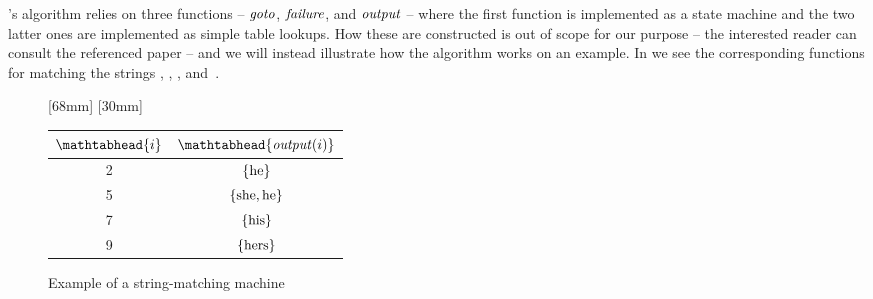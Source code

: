 \citeauthor{AhoCorasick:1975}'s algorithm relies on three functions --
$\textrm{\textit{goto}}$, $\textrm{\textit{failure}}$, and $\textrm{\textit{output}}$ -- where the
first function is implemented as a \gls{state machine} and the two latter ones
are implemented as simple table lookups.
%
How these are constructed is out of scope for our purpose -- the interested
reader can consult the referenced paper -- and we will instead illustrate how
the algorithm works on an example.
%
In  we see the corresponding functions for
matching the strings , , , and~.
%
\begin{figure}
  \centering%

  \mbox{}%
  \hfill%
                [68mm]%
                {%
                }%
  \hfill%
                [30mm]%
                {%
                  \figureFont\figureFontSize%
                  \begin{tabular}{cc}
                    \toprule
                        $\mathtabhead{i}$
                      & $\mathtabhead{\mFunFont{output}(i)}$\\
                    \midrule
                        2
                      & $\mSet{\text{he}}$\\
                        5
                      & $\mSet{\text{she}, \text{he}}$\\
                        7
                      & $\mSet{\text{his}}$\\
                        9
                      & $\mSet{\text{hers}}$\\
                    \bottomrule
                  \end{tabular}%
                }%
  \hfill%
  \mbox{}

  \vspace{\betweensubfigures}


  \caption[Example of a string-matching machine]%
          {Example of a string-matching machine~\cite{AhoCorasick:1975}}
\end{figure}

